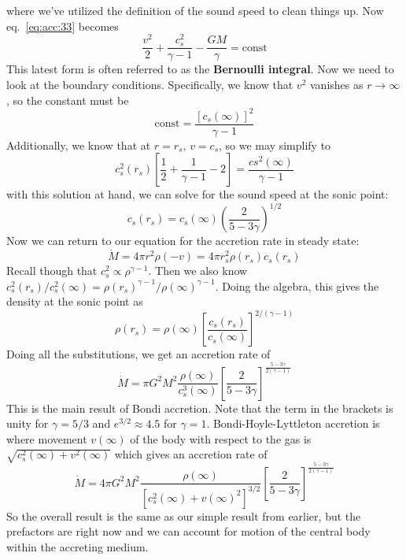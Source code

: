 \documentclass[10pt]{article}
\numberwithin{equation}{section}
\begin{document}
		where we've utilized the definition of the sound speed to clean things up. Now eq.~\eqref{eq:acc:33} becomes
		\begin{equation}
			\frac{v^2}{2} + \frac{c_s^2}{\gamma-1} - \frac{GM}{\gamma} = \mathrm{const}
		\end{equation}
		This latest form is often referred to as the \textbf{Bernoulli integral}. Now we need to look at the boundary conditions. Specifically, we know that $v^2$ vanishes as $r\to\infty$, so the constant must be 
		\begin{equation}
			\label{eq:acc:35} \mathrm{const} = \frac{\left[c_s(\infty)\right]^2}{\gamma-1}
		\end{equation}
		Additionally, we know that at $r=r_s$, $v = c_s$, so we may simplify to
		\begin{equation}
			\label{eq:acc:36} c_s^2(r_s)\left[\frac{1}{2}+\frac{1}{\gamma-1} - 2 \right] = \frac{cs^2(\infty)}{\gamma-1}
		\end{equation}
		with this solution at hand, we can solve for the sound speed at the sonic point:
		\begin{equation}
			\label{eq:acc:37} c_s(r_s) = c_s(\infty)\left(\frac{2}{5-3\gamma}\right)^{1/2}
		\end{equation}
		Now we can return to our equation for the accretion rate in steady state:
		\begin{equation}
			\label{eq:acc:38} \dot{M} = 4\pi r^2 \rho(-v) = 4\pi r_s^2\rho(r_s)c_s(r_s)
		\end{equation}
		Recall though that $c_s^2\propto \rho^{\gamma-1}$. Then we also know $c_s^2(r_s)/c_s^2(\infty) = \rho(r_s)^{\gamma-1}/\rho(\infty)^{\gamma-1}$. Doing the algebra, this gives the density at the sonic point as
		\begin{equation}
			\label{eq:acc:39} \rho(r_s) = \rho(\infty)\left[\frac{c_s(r_s)}{c_s(\infty)}\right]^{2/(\gamma-1)}
		\end{equation}
		Doing all the substitutions, we get an accretion rate of
		\begin{equation}
			\label{eq:acc:40} 
			\boxed{\dot{M} = \pi G^2 M^2 \frac{\rho(\infty)}{c_s^3(\infty)} \left[ \frac{2}{5-3\gamma}\right ]^{\frac{5-3\gamma}{2(\gamma-1)}}}
		\end{equation}
		This is the main result of Bondi accretion. Note that the term in the brackets is unity for $\gamma = 5/3$ and  $e^{3/2}\approx 4.5$ for $\gamma = 1$. Bondi-Hoyle-Lyttleton accretion is where movement $v(\infty)$ of the body with respect to the gas is $\sqrt{c_s^2(\infty) + v^2(\infty)}$ which gives an accretion rate of
		\begin{equation}
			\label{eq:acc:41} \dot{M} = 4\pi G^2 M^2 \frac{\rho(\infty)}{\left[c_s^2(\infty) + v(\infty)^2\right]^{3/2}} \left[\frac{2}{5-3\gamma}\right]^{\frac{5-3\gamma}{2(\gamma-1)}}
		\end{equation}
		So the overall result is the same as our simple result from earlier, but the prefactors are right now and we can account for motion of the central body within the accreting medium.\\
		
\end{document}
